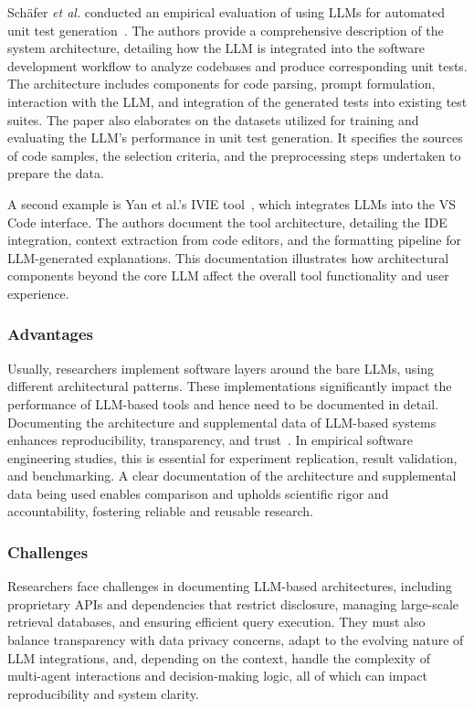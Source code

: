 Sch{\"{a}}fer \textit{et al.} conducted an empirical evaluation of using LLMs for automated unit test generation~\cite{DBLP:journals/tse/SchaferNET24}. The authors provide a comprehensive description of the system architecture, detailing how the LLM is integrated into the software development workflow to analyze codebases and produce corresponding unit tests. The architecture includes components for code parsing, prompt formulation, interaction with the LLM, and integration of the generated tests into existing test suites. The paper also elaborates on the datasets utilized for training and evaluating the LLM's performance in unit test generation. It specifies the sources of code samples, the selection criteria, and the preprocessing steps undertaken to prepare the data.

A second example is Yan et al.'s IVIE tool~\cite{DBLP:conf/chi/YanHWH24}, which integrates LLMs into the VS Code interface. The authors document the tool architecture, detailing the IDE integration, context extraction from code editors, and the formatting pipeline for LLM-generated explanations. This documentation illustrates how architectural components beyond the core LLM affect the overall tool functionality and user experience.

\subsubsection{Advantages}

Usually, researchers implement software layers around the bare LLMs, using different architectural patterns.
These implementations significantly impact the performance of LLM-based tools and hence need to be documented in detail.
Documenting the architecture and supplemental data of LLM-based systems enhances reproducibility, transparency, and trust~\cite{DBLP:journals/software/LuZXXW24}.
In empirical software engineering studies, this is essential for experiment replication, result validation, and benchmarking. A clear documentation of the architecture and supplemental data being used enables comparison and upholds scientific rigor and accountability, fostering reliable and reusable research.

\subsubsection{Challenges}

Researchers face challenges in documenting LLM-based architectures, including proprietary APIs and dependencies that restrict disclosure, managing large-scale retrieval databases, and ensuring efficient query execution. They must also balance transparency with data privacy concerns, adapt to the evolving nature of LLM integrations, and, depending on the context, handle the complexity of multi-agent interactions and decision-making logic, all of which can impact reproducibility and system clarity.

